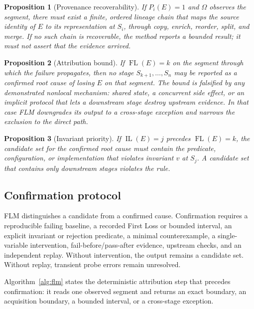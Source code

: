 \documentclass[10pt]{article}
\newtheorem{proposition}{Proposition}
\newcommand{\FL}{\operatorname{FL}}
\newcommand{\IL}{\operatorname{IL}}
\begin{document}
\begin{proposition}[Provenance recoverability]\label{prop:p2}
If $P_i(E)=1$ and $\Omega$ observes the segment, there must exist a finite, ordered lineage chain that maps the source identity of $E$ to its representation at $S_i$, through copy, enrich, reorder, split, and merge. If no such chain is recoverable, the method reports a bounded result; it must not assert that the evidence arrived.
\end{proposition}

\begin{proposition}[Attribution bound]\label{prop:p3}
If $\FL(E)=k$ on the segment through which the failure propagates, then no stage $S_{k+1},\ldots,S_n$ may be reported as a confirmed root cause of losing $E$ on that segment. The bound is falsified by any demonstrated nonlocal mechanism: shared state, a concurrent side effect, or an implicit protocol that lets a downstream stage destroy upstream evidence. In that case FLM downgrades its output to a cross-stage exception and narrows the exclusion to the direct path.
\end{proposition}

\begin{proposition}[Invariant priority]\label{prop:p4}
If $\IL(E)=j$ precedes $\FL(E)=k$, the candidate set for the confirmed root cause must contain the predicate, configuration, or implementation that violates invariant $v$ at $S_j$. A candidate set that contains only downstream stages violates the rule.
\end{proposition}

\subsection{Confirmation protocol}
\label{sec:confirmation}

FLM distinguishes a candidate from a confirmed cause. Confirmation requires a reproducible failing baseline, a recorded First Loss or bounded interval, an explicit invariant or rejection predicate, a minimal counterexample, a single-variable intervention, fail-before/pass-after evidence, upstream checks, and an independent replay. Without intervention, the output remains a candidate set. Without replay, transient probe errors remain unresolved.

Algorithm~\ref{alg:flm} states the deterministic attribution step that precedes confirmation: it reads one observed segment and returns an exact boundary, an acquisition boundary, a bounded interval, or a cross-stage exception.
\end{document}
